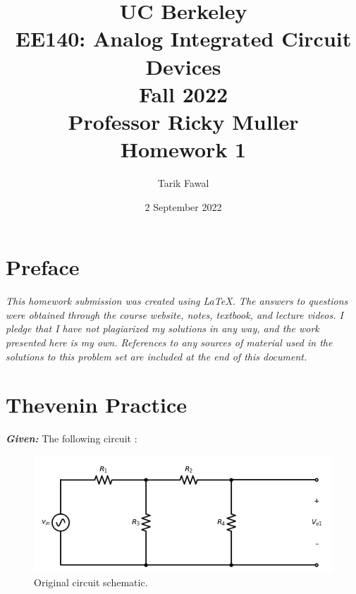 \documentclass[12pt, fleqn]{article}
\title {
    \normalsize{UC Berkeley}\\
    \large{{EE140: Analog Integrated Circuit Devices\\Fall 2022\\Professor Ricky Muller\\}}
    \vspace{0.5ex}
    \Huge{Homework 1}
    \vspace{0.5ex}
}
\author{Tarik Fawal}
\date{2 September 2022}
\begin{document}
\maketitle
\tableofcontents
\flushbottom
    \section*{Preface}
        \textit{\emph{This homework submission was created using \LaTeX.  The answers to questions were obtained through the course website, notes, textbook, and lecture videos.  I pledge that I have not plagiarized my solutions in any way, and the work presented here is my own.  References to any sources of material used in the solutions to this problem set are included at the end of this document.}}
\newpage
\section{Thevenin Practice}
\textbf{\emph{Given: }} The following circuit :
\begin{figure}[H]
\centering
\includegraphics[scale=0.65]{p1.png}
\caption{Original circuit schematic.}
\label{fig:og_circ}
\end{figure}
\end{document}

